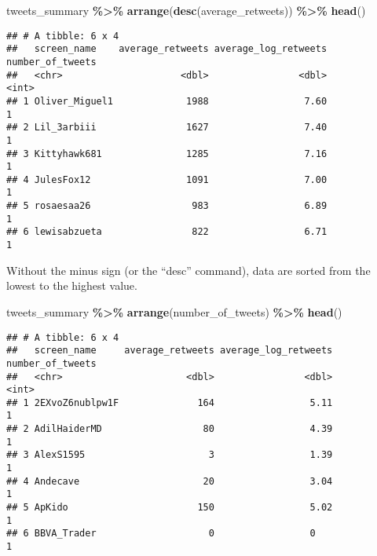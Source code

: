 \documentclass[
]{article}
\newenvironment{Shaded}{\begin{snugshade}}{\end{snugshade}}
\newcommand{\FunctionTok}[1]{\textcolor[rgb]{0.13,0.29,0.53}{\textbf{#1}}}
\newcommand{\NormalTok}[1]{#1}
\newcommand{\SpecialCharTok}[1]{\textcolor[rgb]{0.81,0.36,0.00}{\textbf{#1}}}
\begin{document}
\begin{Shaded}
\begin{Highlighting}[]
\NormalTok{tweets\_summary  }\SpecialCharTok{\%\textgreater{}\%}
  \FunctionTok{arrange}\NormalTok{(}\FunctionTok{desc}\NormalTok{(average\_retweets)) }\SpecialCharTok{\%\textgreater{}\%}
  \FunctionTok{head}\NormalTok{()}
\end{Highlighting}
\end{Shaded}

\begin{verbatim}
## # A tibble: 6 x 4
##   screen_name    average_retweets average_log_retweets number_of_tweets
##   <chr>                     <dbl>                <dbl>            <int>
## 1 Oliver_Miguel1             1988                 7.60                1
## 2 Lil_3arbiii                1627                 7.40                1
## 3 Kittyhawk681               1285                 7.16                1
## 4 JulesFox12                 1091                 7.00                1
## 5 rosaesaa26                  983                 6.89                1
## 6 lewisabzueta                822                 6.71                1
\end{verbatim}

Without the minus sign (or the ``desc'' command), data are sorted from the lowest to the highest value.

\begin{Shaded}
\begin{Highlighting}[]
\NormalTok{tweets\_summary  }\SpecialCharTok{\%\textgreater{}\%}
  \FunctionTok{arrange}\NormalTok{(number\_of\_tweets) }\SpecialCharTok{\%\textgreater{}\%}
  \FunctionTok{head}\NormalTok{()}
\end{Highlighting}
\end{Shaded}

\begin{verbatim}
## # A tibble: 6 x 4
##   screen_name     average_retweets average_log_retweets number_of_tweets
##   <chr>                      <dbl>                <dbl>            <int>
## 1 2EXvoZ6nublpw1F              164                 5.11                1
## 2 AdilHaiderMD                  80                 4.39                1
## 3 AlexS1595                      3                 1.39                1
## 4 Andecave                      20                 3.04                1
## 5 ApKido                       150                 5.02                1
## 6 BBVA_Trader                    0                 0                   1
\end{verbatim}
\end{document}
